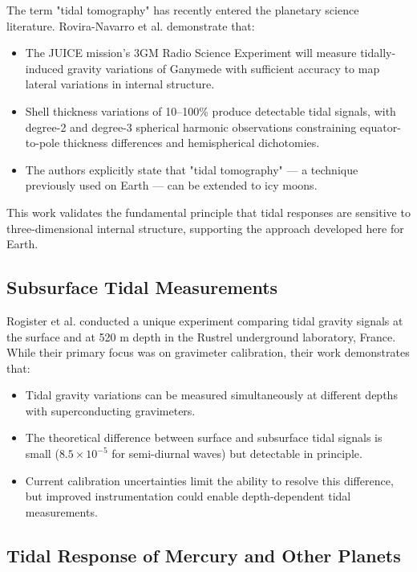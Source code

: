 \documentclass[12pt,a4paper]{article}
\theoremstyle{remark}
\begin{document}
	The term "tidal tomography" has recently entered the planetary science literature. Rovira-Navarro et al. \cite{RoviraNavarro2025} demonstrate that:
	
	\begin{itemize}
		\item The JUICE mission's 3GM Radio Science Experiment will measure tidally-induced gravity variations of Ganymede with sufficient accuracy to map lateral variations in internal structure.
		\item Shell thickness variations of 10–100\% produce detectable tidal signals, with degree-2 and degree-3 spherical harmonic observations constraining equator-to-pole thickness differences and hemispherical dichotomies.
		\item The authors explicitly state that "tidal tomography" — a technique previously used on Earth — can be extended to icy moons.
	\end{itemize}
	
	This work validates the fundamental principle that tidal responses are sensitive to three-dimensional internal structure, supporting the approach developed here for Earth.
	
	\subsection{Subsurface Tidal Measurements}
	
	Rogister et al. \cite{Rogister2024} conducted a unique experiment comparing tidal gravity signals at the surface and at 520 m depth in the Rustrel underground laboratory, France. While their primary focus was on gravimeter calibration, their work demonstrates that:
	
	\begin{itemize}
		\item Tidal gravity variations can be measured simultaneously at different depths with superconducting gravimeters.
		\item The theoretical difference between surface and subsurface tidal signals is small ($8.5 \times 10^{-5}$ for semi-diurnal waves) but detectable in principle.
		\item Current calibration uncertainties limit the ability to resolve this difference, but improved instrumentation could enable depth-dependent tidal measurements.
	\end{itemize}
	
	\subsection{Tidal Response of Mercury and Other Planets}
	
\end{document}
